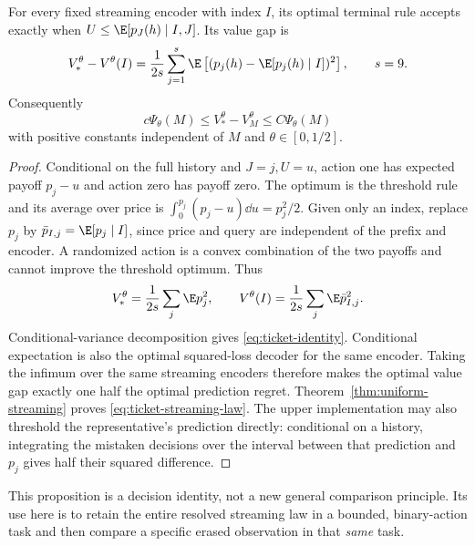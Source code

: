 \begin{proposition}\label{prop:ticket-identity}
For every fixed streaming encoder with index $I$, its optimal terminal
rule accepts exactly when $U\le\E[p_J(h)\mid I,J]$. Its value gap is
\begin{equation}\label{eq:ticket-identity}
 V_*^\theta-V^\theta(I)
   =\frac1{2s}\sum_{j=1}^s
        \E\left[(p_j(h)-\E[p_j(h)\mid I])^2\right],\qquad s=9.
\end{equation}
Consequently
\begin{equation}\label{eq:ticket-streaming-law}
 c\Psi_\theta(M)\le V_*^\theta-V_M^\theta\le C\Psi_\theta(M)
\end{equation}
with positive constants independent of $M$ and $\theta\in[0,1/2]$.
\end{proposition}
\begin{proof}
Conditional on the full history and $J=j,U=u$, action one has expected
payoff $p_j-u$ and action zero has payoff zero. The optimum is the
threshold rule and its average over price is
$\int_0^{p_j}(p_j-u)\dd u=p_j^2/2$. Given only an index, replace
$p_j$ by $\bar p_{I,j}=\E[p_j\mid I]$, since price and query are
independent of the prefix and encoder. A randomized action is a convex
combination of the two payoffs and cannot improve the threshold optimum.
Thus
\[
 V_*^\theta=\frac1{2s}\sum_j\E p_j^2,
 \qquad V^\theta(I)=\frac1{2s}\sum_j\E\bar p_{I,j}^2.
\]
Conditional-variance decomposition gives \eqref{eq:ticket-identity}.
Conditional expectation is also the optimal squared-loss decoder for
the same encoder. Taking the infimum over the same streaming encoders
therefore makes the optimal value gap exactly one half the optimal
prediction regret. Theorem~\ref{thm:uniform-streaming} proves
\eqref{eq:ticket-streaming-law}. The upper implementation may also
threshold the representative's prediction directly: conditional on a
history, integrating the mistaken decisions over the interval between
that prediction and $p_j$ gives half their squared difference.
\end{proof}

This proposition is a decision identity, not a new general comparison
principle. Its use here is to retain the entire resolved streaming law
in a bounded, binary-action task and then compare a specific erased
observation in that \emph{same} task.

